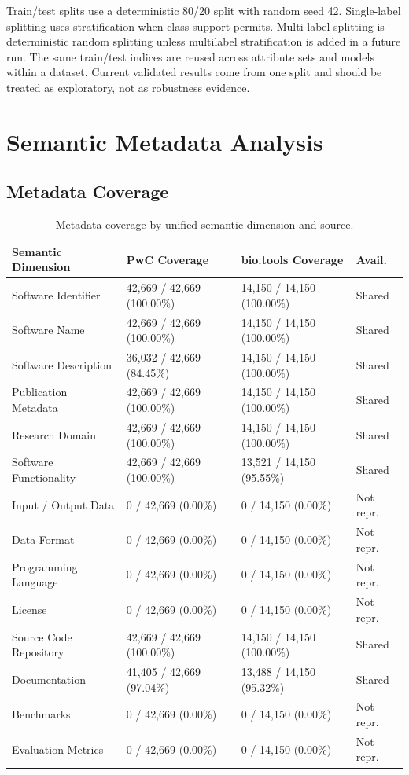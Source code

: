 \documentclass[pdflatex,sn-mathphys-num]{sn-jnl}
\theoremstyle{thmstyleone}%
\theoremstyle{thmstyletwo}%
\theoremstyle{thmstylethree}%
\begin{document}
Train/test splits use a deterministic 80/20 split with random seed 42. Single-label splitting uses stratification when class support permits. Multi-label splitting is deterministic random splitting unless multilabel stratification is added in a future run. The same train/test indices are reused across attribute sets and models within a dataset. Current validated results come from one split and should be treated as exploratory, not as robustness evidence.

\section{Semantic Metadata Analysis}
\label{sec:semantic-analysis}

\subsection{Metadata Coverage}
\label{subsec:semantic-coverage}

\begin{table}[htbp]
\centering
\scriptsize
\caption{Metadata coverage by unified semantic dimension and source.}
\label{tab:semantic-dimension-coverage}
\begin{tabularx}{\textwidth}{p{3.1cm}p{3.4cm}p{3.4cm}Y}
\toprule
Semantic Dimension & PwC Coverage & bio.tools Coverage & Avail. \\
\midrule
Software Identifier & 42,669 / 42,669 (100.00\%) & 14,150 / 14,150 (100.00\%) & Shared \\
Software Name & 42,669 / 42,669 (100.00\%) & 14,150 / 14,150 (100.00\%) & Shared \\
Software Description & 36,032 / 42,669 (84.45\%) & 14,150 / 14,150 (100.00\%) & Shared \\
Publication Metadata & 42,669 / 42,669 (100.00\%) & 14,150 / 14,150 (100.00\%) & Shared \\
Research Domain & 42,669 / 42,669 (100.00\%) & 14,150 / 14,150 (100.00\%) & Shared \\
Software Functionality & 42,669 / 42,669 (100.00\%) & 13,521 / 14,150 (95.55\%) & Shared \\
Input / Output Data & 0 / 42,669 (0.00\%) & 0 / 14,150 (0.00\%) & Not repr. \\
Data Format & 0 / 42,669 (0.00\%) & 0 / 14,150 (0.00\%) & Not repr. \\
Programming Language & 0 / 42,669 (0.00\%) & 0 / 14,150 (0.00\%) & Not repr. \\
License & 0 / 42,669 (0.00\%) & 0 / 14,150 (0.00\%) & Not repr. \\
Source Code Repository & 42,669 / 42,669 (100.00\%) & 14,150 / 14,150 (100.00\%) & Shared \\
Documentation & 41,405 / 42,669 (97.04\%) & 13,488 / 14,150 (95.32\%) & Shared \\
Benchmarks & 0 / 42,669 (0.00\%) & 0 / 14,150 (0.00\%) & Not repr. \\
Evaluation Metrics & 0 / 42,669 (0.00\%) & 0 / 14,150 (0.00\%) & Not repr. \\
\bottomrule
\end{tabularx}
\end{table}
\end{document}
